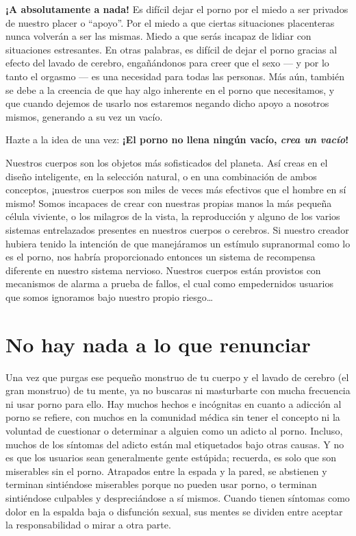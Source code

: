 \documentclass[
  spanish,
  openany]{book}
\begin{document}
\textbf{¡A absolutamente a nada!} Es difícil dejar el porno por el miedo a ser privados de nuestro placer o ``apoyo''. Por el miedo a que ciertas situaciones placenteras nunca volverán a ser las mismas. Miedo a que serás incapaz de lidiar con situaciones estresantes. En otras palabras, es difícil de dejar el porno gracias al efecto del lavado de cerebro, engañándonos para creer que el sexo --- y por lo tanto el orgasmo --- es una necesidad para todas las personas. Más aún, también se debe a la creencia de que hay algo inherente en el porno que necesitamos, y que cuando dejemos de usarlo nos estaremos negando dicho apoyo a nosotros mismos, generando a su vez un vacío.

Hazte a la idea de una vez: \textbf{¡El porno no llena ningún vacío, \emph{crea un vacío}!}

Nuestros cuerpos son los objetos más sofisticados del planeta. Así creas en el diseño inteligente, en la selección natural, o en una combinación de ambos conceptos, ¡nuestros cuerpos son miles de veces más efectivos que el hombre en sí mismo! Somos incapaces de crear con nuestras propias manos la más pequeña célula viviente, o los milagros de la vista, la reproducción y alguno de los varios sistemas entrelazados presentes en nuestros cuerpos o cerebros. Si nuestro creador hubiera tenido la intención de que manejáramos un estímulo supranormal como lo es el porno, nos habría proporcionado entonces un sistema de recompensa diferente en nuestro sistema nervioso. Nuestros cuerpos están provistos con mecanismos de alarma a prueba de fallos, el cual como empedernidos usuarios que somos ignoramos bajo nuestro propio riesgo\ldots{}

\hypertarget{no-hay-nada-a-lo-que-renunciar}{%
\section{No hay nada a lo que renunciar}\label{no-hay-nada-a-lo-que-renunciar}}

Una vez que purgas ese pequeño monstruo de tu cuerpo y el lavado de cerebro (el gran monstruo) de tu mente, ya no buscaras ni masturbarte con mucha frecuencia ni usar porno para ello. Hay muchos hechos e incógnitas en cuanto a adicción al porno se refiere, con muchos en la comunidad médica sin tener el concepto ni la voluntad de cuestionar o determinar a alguien como un adicto al porno. Incluso, muchos de los síntomas del adicto están mal etiquetados bajo otras causas. Y no es que los usuarios sean generalmente gente estúpida; recuerda, es solo que son miserables sin el porno. Atrapados entre la espada y la pared, se abstienen y terminan sintiéndose miserables porque no pueden usar porno, o terminan sintiéndose culpables y despreciándose a sí mismos. Cuando tienen síntomas como dolor en la espalda baja o disfunción sexual, sus mentes se dividen entre aceptar la responsabilidad o mirar a otra parte.
\end{document}
